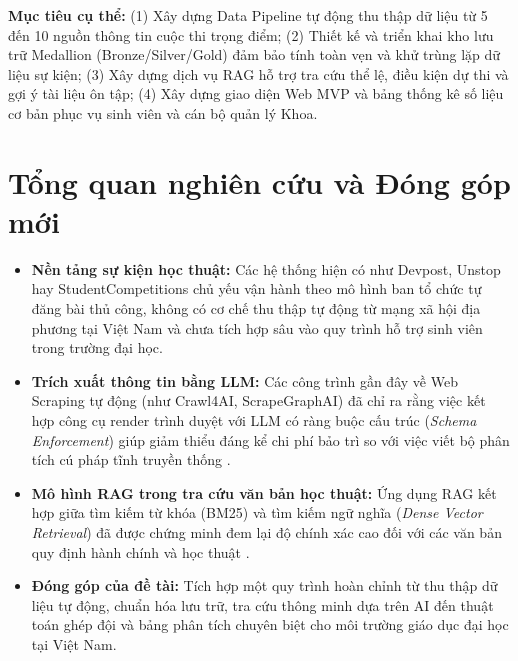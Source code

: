 \documentclass[11pt,a4paper]{article}
\begin{document}
\begin{enumerate}
\noindent\textbf{Mục tiêu cụ thể:}
(1) Xây dựng Data Pipeline tự động thu thập dữ liệu từ 5 đến 10 nguồn thông tin cuộc thi trọng điểm; 
(2) Thiết kế và triển khai kho lưu trữ Medallion (Bronze/Silver/Gold) đảm bảo tính toàn vẹn và khử trùng lặp dữ liệu sự kiện; 
(3) Xây dựng dịch vụ RAG hỗ trợ tra cứu thể lệ, điều kiện dự thi và gợi ý tài liệu ôn tập; 
(4) Xây dựng giao diện Web MVP và bảng thống kê số liệu cơ bản phục vụ sinh viên và cán bộ quản lý Khoa.

\section{Tổng quan nghiên cứu và Đóng góp mới}
\begin{itemize}
    \item \textbf{Nền tảng sự kiện học thuật:} Các hệ thống hiện có như Devpost, Unstop hay StudentCompetitions chủ yếu vận hành theo mô hình ban tổ chức tự đăng bài thủ công, không có cơ chế thu thập tự động từ mạng xã hội địa phương tại Việt Nam và chưa tích hợp sâu vào quy trình hỗ trợ sinh viên trong trường đại học.
    \item \textbf{Trích xuất thông tin bằng LLM:} Các công trình gần đây về Web Scraping tự động (như Crawl4AI, ScrapeGraphAI) đã chỉ ra rằng việc kết hợp công cụ render trình duyệt với LLM có ràng buộc cấu trúc (\textit{Schema Enforcement}) giúp giảm thiểu đáng kể chi phí bảo trì so với việc viết bộ phân tích cú pháp tĩnh truyền thống \cite{xu2024llmie}.
    \item \textbf{Mô hình RAG trong tra cứu văn bản học thuật:} Ứng dụng RAG kết hợp giữa tìm kiếm từ khóa (BM25) và tìm kiếm ngữ nghĩa (\textit{Dense Vector Retrieval}) đã được chứng minh đem lại độ chính xác cao đối với các văn bản quy định hành chính và học thuật \cite{lewis2020rag, gao2023ragsurvey}.
    \item \textbf{Đóng góp của đề tài:} Tích hợp một quy trình hoàn chỉnh từ thu thập dữ liệu tự động, chuẩn hóa lưu trữ, tra cứu thông minh dựa trên AI đến thuật toán ghép đội \cite{lappas2009team} và bảng phân tích chuyên biệt cho môi trường giáo dục đại học tại Việt Nam.
\end{itemize}


\end{enumerate}
\end{document}
